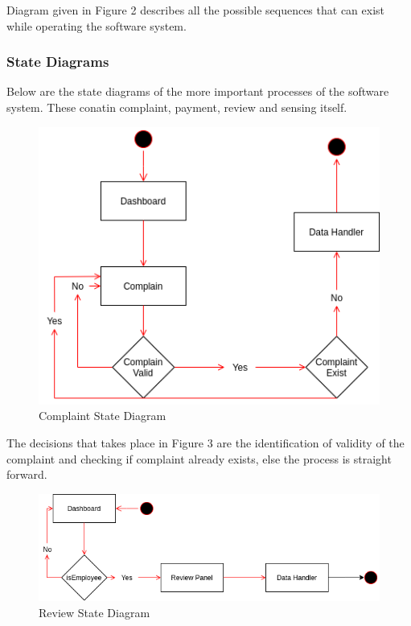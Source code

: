 \documentclass[10pt,twocolumn,letterpaper]{article}
\begin{document}
\noindent Diagram given in Figure 2 describes all the possible sequences that can exist while 
operating the software system.

\subsubsection*{State Diagrams}
Below are the state diagrams of the more important processes of the 
software system. These conatin complaint, payment, review and sensing itself.\\
\begin{figure}[h]
    \centering
    \includegraphics[scale=0.3]{img/State Diagram1.png}    
    \caption{Complaint State Diagram}
\end{figure}

\noindent The decisions that takes place in Figure 3 are the identification 
of validity of the complaint and checking if complaint already exists, 
else the process is straight forward.\\
\begin{figure}[h]
    \centering
    \includegraphics[scale=0.3]{img/State Diagram2.png}    
    \caption{Review State Diagram}
\end{figure}
\end{document}
